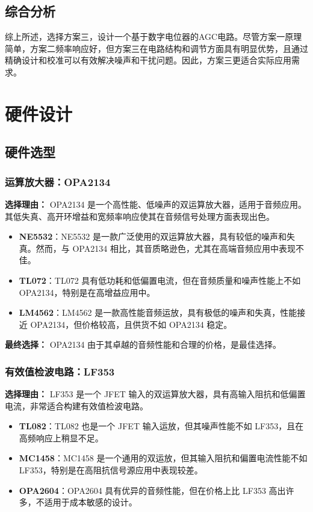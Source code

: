 \documentclass[lang=cn,11pt,a4paper]{elegantpaper}
\begin{document}
\subsection{综合分析}

综上所述，选择方案三，设计一个基于数字电位器的AGC电路。尽管方案一原理简单，方案二频率响应好，但方案三在电路结构和调节方面具有明显优势，且通过精确设计和校准可以有效解决噪声和干扰问题。因此，方案三更适合实际应用需求。

\section{硬件设计}
\subsection{硬件选型}

\subsubsection{运算放大器：OPA2134}
\textbf{选择理由：} OPA2134 是一个高性能、低噪声的双运算放大器，适用于音频应用。其低失真、高开环增益和宽频率响应使其在音频信号处理方面表现出色。

\begin{itemize}
  \item \textbf{NE5532}：NE5532 是一款广泛使用的双运算放大器，具有较低的噪声和失真。然而，与 OPA2134 相比，其音质略逊色，尤其在高端音频应用中表现不佳。
  \item \textbf{TL072}：TL072 具有低功耗和低偏置电流，但在音频质量和噪声性能上不如 OPA2134，特别是在高增益应用中。
  \item \textbf{LM4562}：LM4562 是一款高性能音频运放，具有极低的噪声和失真，性能接近 OPA2134，但价格较高，且供货不如 OPA2134 稳定。
\end{itemize}

\textbf{最终选择：} OPA2134 由于其卓越的音频性能和合理的价格，是最佳选择。

\subsubsection{有效值检波电路：LF353}
\textbf{选择理由：} LF353 是一个 JFET 输入的双运算放大器，具有高输入阻抗和低偏置电流，非常适合构建有效值检波电路。

\begin{itemize}
  \item \textbf{TL082}：TL082 也是一个 JFET 输入运放，但其噪声性能不如 LF353，且在高频响应上稍显不足。
  \item \textbf{MC1458}：MC1458 是一个通用的双运放，但其输入阻抗和偏置电流性能不如 LF353，特别是在高阻抗信号源应用中表现较差。
  \item \textbf{OPA2604}：OPA2604 具有优异的音频性能，但在价格上比 LF353 高出许多，不适用于成本敏感的设计。
\end{itemize}
\end{document}
